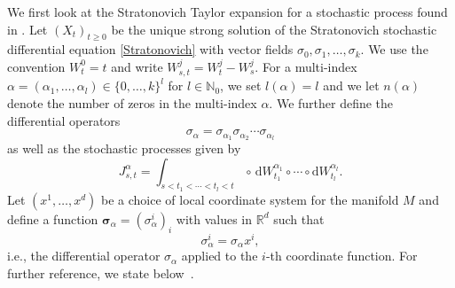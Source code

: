 \documentclass[10pt]{amsart}
\theoremstyle{remark}
\newcommand{\bfsigma}{\boldsymbol \sigma}
\newcommand{\R}{\mathbb{R}}
\newcommand{\N}{\mathbb{N}}
\newcommand{\dd}{\,{\mathrm d}}
\newcommand{\db}{{\mathrm d}}
\numberwithin{equation}{section}
\begin{document}
We first look at the Stratonovich Taylor expansion for a stochastic process found in \cite[Chapter~5 and Chapter~10.7]{kloeden1992stochastic}.
Let $(X_t)_{t\geq 0}$ be the unique strong solution of the Stratonovich stochastic differential equation \eqref{Stratonovich} with vector fields $\sigma_0, \sigma_1, \dots, \sigma_k$. We use the convention $W^0_t =t$ and write $W_{s,t}^j = W_t^j - W_s^j$. For a multi-index $\alpha = (\alpha_1, \dots, \alpha_l) \in \{0,\dots, k\}^l$ for $l\in\N_0$, we set $l(\alpha) = l$ and we let $n(\alpha)$ denote the number of zeros in the multi-index $\alpha$. We further define the differential operators
$$\sigma_\alpha = \sigma_{\alpha_1} \sigma_{\alpha_{2}} \cdots \sigma_{\alpha_l}$$
as well as the stochastic processes given by
$$J^\alpha_{s,t} = \int_{s<t_1< \cdots < t_{l}<t} \circ \dd W_{t_1}^{\alpha_1} \circ \cdots \circ \db W_{t_l}^{\alpha_l}.$$
Let $(x^1, \dots, x^d)$ be a choice of local coordinate system for the manifold $M$ and define a function $\bfsigma_\alpha =(\sigma_{\alpha}^i)_i$ with values in $\R^d$ such that
$$\sigma_\alpha^i = \sigma_\alpha x^i,$$
i.e., the differential operator $\sigma_\alpha$ applied to the $i$-th coordinate function.
For further reference, we state below~\cite[Theorem~10.7.1 and Corollary~10.7.2]{kloeden1992stochastic}.
\end{document}
